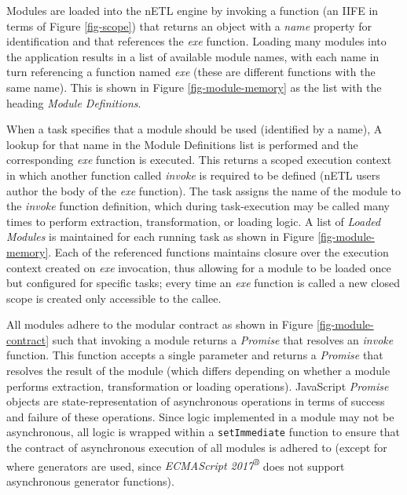 

Modules are loaded into the nETL engine by invoking a function (an IIFE in terms of Figure \ref{fig-scope}) that returns an object with a \textit{name} property for identification and that references the \textit{exe} function. Loading many modules into the application results in a list of available module names, with each name in turn referencing a function named \textit{exe} (these are different functions with the same name). This is shown in Figure \ref{fig-module-memory} as the list with the heading \textit{Module Definitions}.

When a task specifies that a module should be used (identified by a name), A lookup for that name in the Module Definitions list is performed and the corresponding \textit{exe} function is executed. This returns a scoped execution context\cite{executionContext} in which another function called \textit{invoke} is required to be defined (nETL users author the body of the \textit{exe} function). The task assigns the name of the module to the \textit{invoke} function definition, which during task-execution may be called many times to perform extraction, transformation, or loading logic. A list of \textit{Loaded Modules} is maintained for each running task as shown in Figure \ref{fig-module-memory}. Each of the referenced functions maintains closure over the execution context created on \textit{exe} invocation, thus allowing for a module to be loaded once but configured for specific tasks; every time an \textit{exe} function is called a new closed scope is created only accessible to the callee.



All modules adhere to the modular contract as shown in Figure \ref{fig-module-contract} such that invoking a module returns a \textit{Promise} \cite{jsPromises} that resolves an \textit{invoke} function. This function accepts a single parameter and returns a \textit{Promise} that resolves the result of the module (which differs depending on whether a module performs extraction, transformation or loading operations). JavaScript \textit{Promise} objects are state-representation of asynchronous operations in terms of success and failure of these operations. Since logic implemented in a module may not be asynchronous, all logic is wrapped within a \texttt{setImmediate} function to ensure that the contract of asynchronous execution of all modules is adhered to (except for where generators are used, since \textit{ECMAScript 2017\textsuperscript{®}} does not support asynchronous generator functions).

